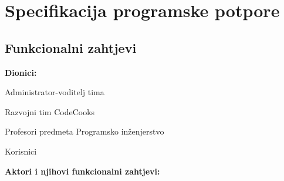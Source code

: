 \chapter{Specifikacija programske potpore}
		
	\section{Funkcionalni zahtjevi}
			
			\noindent \textbf{Dionici:}
			
			\begin{packed_enum}
				
				\item Administrator-voditelj tima
				\item Razvojni tim CodeCooks			
				\item Profesori predmeta Programsko inženjerstvo
				\item Korisnici
				
			\end{packed_enum}
			
			\noindent \textbf{Aktori i njihovi funkcionalni zahtjevi:}
			
